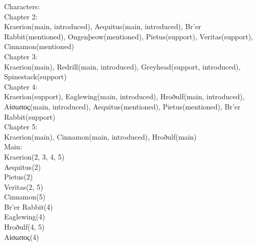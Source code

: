 



Characters:\\[1cm]
Chapter 2:\\[0.1cm]
Kraerion(main, introduced),
Aequitus(main, introduced),
Br'er Rabbit(mentioned),
Ongenþeow(mentioned),
Pietus(support),
Veritas(support),
Cinnamon(mentioned)\\[0.1cm]

Chapter 3:\\[0.1cm]
Kraerion(main),
Redrill(main, introduced),
Greyhead(support, introduced),
Spinestack(support)\\[1cm]

Chapter 4:\\[0.1cm]
Kraerion(support),
Eaglewing(main, introduced), 
Hroðulf(main, introduced), 
Αίσωπος(main, introduced),
Aequitus(mentioned),
Pietus(mentioned),
Br'er Rabbit(support)\\[0.1cm]

Chapter 5:\\[0.1cm]
Kraerion(main),
Cinnamon(main, introduced),
Hroðulf(main)\\[0.1cm]

Main: \\[0.1cm]
Kraerion(2, 3, 4, 5)\\
Aequitus(2)\\
Pietus(2)\\
Veritas(2, 5)\\
Cinnamon(5)\\
Br'er Rabbit(4)\\
Eaglewing(4)\\
Hroðulf(4, 5)\\
Αίσωπος(4)\\
 \\[0.1cm]